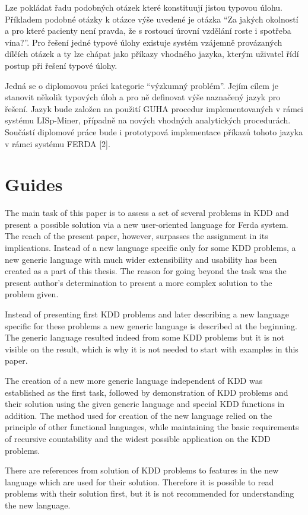 \documentclass[a4paper,12pt]{book}
\newcommand{\uv}[1]{``#1''}
\begin{document}
Lze pokládat řadu podobných otázek které konstituují jistou typovou úlohu. Příkladem podobné otázky k otázce výše uvedené je otázka \uv{Za jakých okolností a pro které pacienty není pravda, že s rostoucí úrovní vzdělání roste i spotřeba vína?}. Pro řešení jedné typové úlohy existuje systém vzájemně provázaných dílčích otázek a ty lze chápat jako příkazy vhodného jazyka, kterým uživatel řídí postup při řešení typové úlohy.

Jedná se o diplomovou práci kategorie \uv{výzkumný problém}. Jejím cílem je stanovit několik typových úloh a pro ně definovat výše naznačený jazyk pro řešení. Jazyk bude založen na použití GUHA procedur implementovaných v rámci systému LISp-Miner, případně na nových vhodných analytických procedurách. Součástí diplomové práce bude i prototypová implementace příkazů tohoto jazyka v rámci systému FERDA [2].

\section*{Guides}
The main task of this paper is to assess a set of several problems in KDD and present a possible solution via a new user-oriented language for Ferda system. The reach of the present paper, however, surpasses the assignment in its implications. Instead of a new language specific only for some KDD problems, a new generic language with much wider extensibility and usability has been created as a part of this thesis. The reason for going beyond the task was the present author's determination to present a more complex solution to the problem given. 

Instead of presenting first KDD problems and later describing a new language specific for these problems a new generic language is described at the beginning. The generic language resulted indeed from some KDD problems but it is not visible on the result, which is why it is not needed to start with examples in this paper.

The creation of a new more generic language independent of KDD was established as the first task, followed by demonstration of KDD problems and their solution using the given generic language and special KDD functions in addition. The method used for creation of the new language relied on the principle of other functional languages, while maintaining the basic requirements of recursive countability and the widest possible application on the KDD problems.

There are references from solution of KDD problems to features in the new language which are used for their solution. Therefore it is possible to read problems with their solution first, but it is not recommended for understanding the new language.
\end{document}
